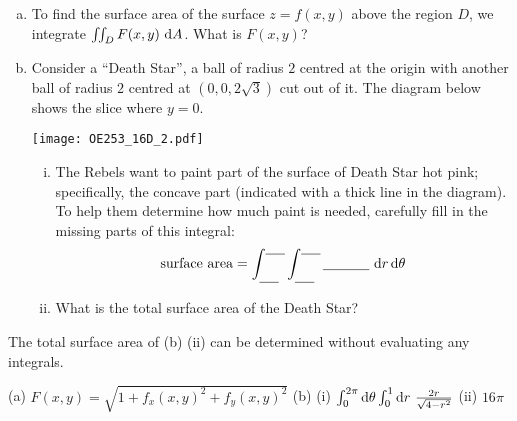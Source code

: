 \begin{question}[M253 2016D] %
\begin{enumerate}[(a)]
\item
To find the surface area of the surface $z = f (x,y)$ above the region $D$, 
we integrate $\dblInt_D F(x,y)\ \dee{A}$. What is $F(x,y)$?
\item
Consider a ``Death Star'',  a ball of radius $2$ centred at the origin 
with another ball of radius $2$ centred at $(0, 0, 2\sqrt{3})$ cut out of it. 
The diagram below shows the slice where $y = 0$.

\begin{center}
     \texttt{[image: OE253\_16D\_2.pdf]}
\end{center}

\begin{enumerate}[(i)]
\item
The Rebels want to paint part of the surface of Death Star hot pink; specifically, the concave part (indicated with a thick line in the diagram). 
To help them determine how much paint is needed, carefully fill in the 
missing parts of this integral:
\begin{equation*}
\text{surface area} = 
\int_{\underline{\ \ \ \ }}^{\underline{\ \ \ \ }}
                 \int_{\underline{\ \ \ \ }}^{\underline{\ \ \ \ }}
                        \underline{\ \ \ \ \ \ \ \ \ \ }\ \dee{r}\,\dee{\theta}
\end{equation*}

\item
What is the total surface area of the Death Star?
\end{enumerate}
\end{enumerate}
\end{question}

\begin{hint}
The total surface area of (b) (ii) can be determined without evaluating
any integrals.
\end{hint}

\begin{answer}
(a)  $F(x,y) = \sqrt{1+f_x(x,y)^2+f_y(x,y)^2}$
\qquad
(b) (i) $\int_0^{2\pi}\dee{\theta}\int_0^1\dee{r}\ \frac{2r}{\sqrt{4-r^2}}$ 
\qquad (ii) $16\pi$
\end{answer}

